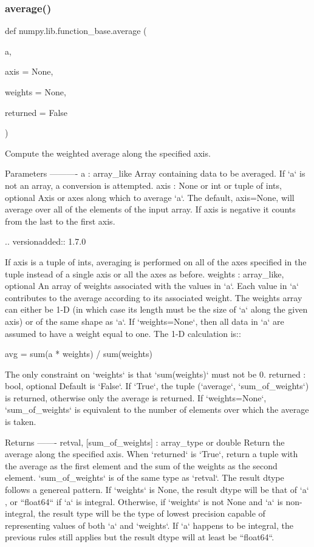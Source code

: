 \subsubsection{\texorpdfstring{average()}{average()}}
{\footnotesize\ttfamily def numpy.\+lib.\+function\+\_\+base.\+average (\begin{DoxyParamCaption}\item[{}]{a,  }\item[{}]{axis = {\ttfamily None},  }\item[{}]{weights = {\ttfamily None},  }\item[{}]{returned = {\ttfamily False} }\end{DoxyParamCaption})}

\begin{DoxyVerb}Compute the weighted average along the specified axis.

Parameters
----------
a : array_like
    Array containing data to be averaged. If `a` is not an array, a
    conversion is attempted.
axis : None or int or tuple of ints, optional
    Axis or axes along which to average `a`.  The default,
    axis=None, will average over all of the elements of the input array.
    If axis is negative it counts from the last to the first axis.

    .. versionadded:: 1.7.0

    If axis is a tuple of ints, averaging is performed on all of the axes
    specified in the tuple instead of a single axis or all the axes as
    before.
weights : array_like, optional
    An array of weights associated with the values in `a`. Each value in
    `a` contributes to the average according to its associated weight.
    The weights array can either be 1-D (in which case its length must be
    the size of `a` along the given axis) or of the same shape as `a`.
    If `weights=None`, then all data in `a` are assumed to have a
    weight equal to one.  The 1-D calculation is::

        avg = sum(a * weights) / sum(weights)

    The only constraint on `weights` is that `sum(weights)` must not be 0.
returned : bool, optional
    Default is `False`. If `True`, the tuple (`average`, `sum_of_weights`)
    is returned, otherwise only the average is returned.
    If `weights=None`, `sum_of_weights` is equivalent to the number of
    elements over which the average is taken.

Returns
-------
retval, [sum_of_weights] : array_type or double
    Return the average along the specified axis. When `returned` is `True`,
    return a tuple with the average as the first element and the sum
    of the weights as the second element. `sum_of_weights` is of the
    same type as `retval`. The result dtype follows a genereal pattern.
    If `weights` is None, the result dtype will be that of `a` , or ``float64``
    if `a` is integral. Otherwise, if `weights` is not None and `a` is non-
    integral, the result type will be the type of lowest precision capable of
    representing values of both `a` and `weights`. If `a` happens to be
    integral, the previous rules still applies but the result dtype will
    at least be ``float64``.


\end{DoxyVerb}
